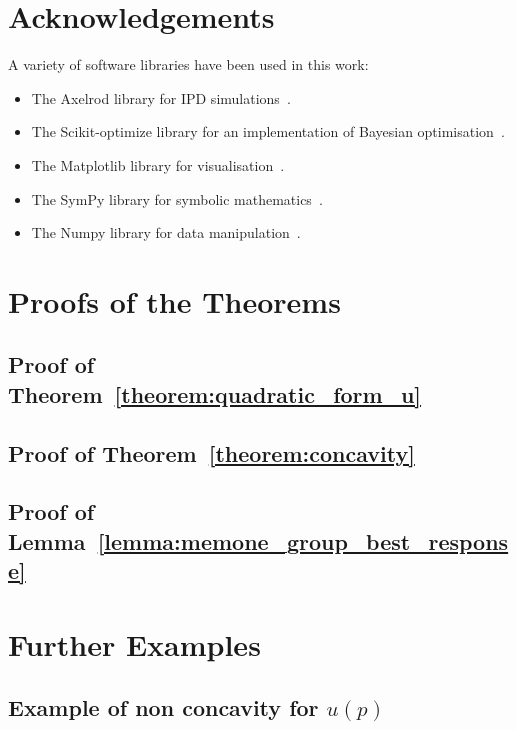 \documentclass[10pt]{article}
\begin{document}
\section{Acknowledgements}

A variety of software libraries have been used in this work:

\begin{itemize}
    \item The Axelrod library for IPD simulations~\cite{axelrodproject}.
    \item The Scikit-optimize library for an implementation of Bayesian optimisation~\cite{tim_head_2018_1207017}.
    \item The Matplotlib library for visualisation~\cite{hunter2007matplotlib}.
    \item The SymPy library for symbolic mathematics~\cite{sympy}.
    \item The Numpy library for data manipulation~\cite{walt2011numpy}.
\end{itemize}




\begin{appendices}

\section{Proofs of the Theorems}\label{section:appendix_a}

\subsection{Proof of Theorem~\ref{theorem:quadratic_form_u}}\label{appendix:proof_theorem_one}


\subsection{Proof of Theorem~\ref{theorem:concavity}}\label{appendix:proof_theorem_three}


\subsection{Proof of Lemma~\ref{lemma:memone_group_best_response}}\label{appendix:proof_lemma_four}


\section{Further Examples}\label{section:appendix_b}

\subsection{Example of non concavity for \(u(p)\) }\label{appendix:non_concave}


\end{appendices}
\end{document}
